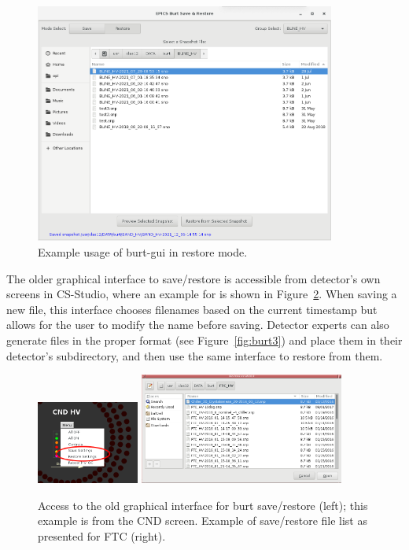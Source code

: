 \documentclass[amsmath,amssymb,notitlepage,11pt]{revtex4}
\begin{document}
\begin{appendices}
\begin{figure}[htbp]\centering
  \includegraphics[width=0.88\textwidth]{pics/burt-gui-restore}
  \caption{Example usage of burt-gui in restore mode.\label{fig:burt-gui-restore}}
\end{figure}

The older graphical interface to save/restore is accessible from detector's own screens in CS-Studio, where an example for is shown in Figure~\ref{fig:burt}.  When saving a new file, this interface chooses filenames based on the current timestamp but allows for the user to modify the name before saving.  Detector experts can also generate files in the proper format (see Figure~\ref{fig:burt3}) and place them in their detector's subdirectory, and then use the same interface to restore from them.
\begin{figure}[htbp]\centering
    \includegraphics[width=0.3\textwidth]{pics/burt1}
    \includegraphics[width=0.6\textwidth]{pics/burt2}
    \caption{Access to the old graphical interface for burt save/restore (left); this example is from the CND screen.  Example of save/restore file list as presented for FTC (right).\label{fig:burt}}
\end{figure}


\end{appendices}
\end{document}
